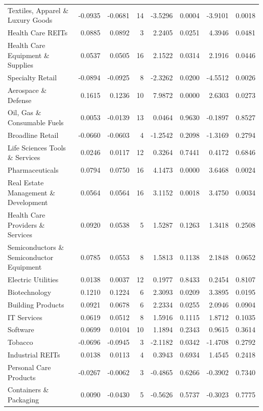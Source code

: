 \begin{table}
\begin{tabular}{lrrrrrrr}
Textiles, Apparel \& Luxury Goods & -0.0935 & -0.0681 & 14 & -3.5296 & 0.0004 & -3.9101 & 0.0018 \\
Health Care REITs & 0.0885 & 0.0892 & 3 & 2.2405 & 0.0251 & 4.3946 & 0.0481 \\
Health Care Equipment \& Supplies & 0.0537 & 0.0505 & 16 & 2.1522 & 0.0314 & 2.1916 & 0.0446 \\
Specialty Retail & -0.0894 & -0.0925 & 8 & -2.3262 & 0.0200 & -4.5512 & 0.0026 \\
Aerospace \& Defense & 0.1615 & 0.1236 & 10 & 7.9872 & 0.0000 & 2.6303 & 0.0273 \\
Oil, Gas \& Consumable Fuels & 0.0053 & -0.0139 & 13 & 0.0464 & 0.9630 & -0.1897 & 0.8527 \\
Broadline Retail & -0.0660 & -0.0603 & 4 & -1.2542 & 0.2098 & -1.3169 & 0.2794 \\
Life Sciences Tools \& Services & 0.0246 & 0.0117 & 12 & 0.3264 & 0.7441 & 0.4172 & 0.6846 \\
Pharmaceuticals & 0.0794 & 0.0750 & 16 & 4.1473 & 0.0000 & 3.6468 & 0.0024 \\
Real Estate Management \& Development & 0.0564 & 0.0564 & 16 & 3.1152 & 0.0018 & 3.4750 & 0.0034 \\
Health Care Providers \& Services & 0.0920 & 0.0538 & 5 & 1.5287 & 0.1263 & 1.3418 & 0.2508 \\
Semiconductors \& Semiconductor Equipment & 0.0785 & 0.0553 & 8 & 1.5813 & 0.1138 & 2.1848 & 0.0652 \\
Electric Utilities & 0.0138 & 0.0037 & 12 & 0.1977 & 0.8433 & 0.2454 & 0.8107 \\
Biotechnology & 0.1210 & 0.1224 & 6 & 2.3093 & 0.0209 & 3.3895 & 0.0195 \\
Building Products & 0.0921 & 0.0678 & 6 & 2.2334 & 0.0255 & 2.0946 & 0.0904 \\
IT Services & 0.0619 & 0.0512 & 8 & 1.5916 & 0.1115 & 1.8712 & 0.1035 \\
Software & 0.0699 & 0.0104 & 10 & 1.1894 & 0.2343 & 0.9615 & 0.3614 \\
Tobacco & -0.0696 & -0.0945 & 3 & -2.1182 & 0.0342 & -1.4708 & 0.2792 \\
Industrial REITs & 0.0138 & 0.0113 & 4 & 0.3943 & 0.6934 & 1.4545 & 0.2418 \\
Personal Care Products & -0.0267 & -0.0062 & 3 & -0.4865 & 0.6266 & -0.3902 & 0.7340 \\
Containers \& Packaging & 0.0090 & -0.0430 & 5 & -0.5626 & 0.5737 & -0.3023 & 0.7775 \\

\end{tabular}
\end{table}
